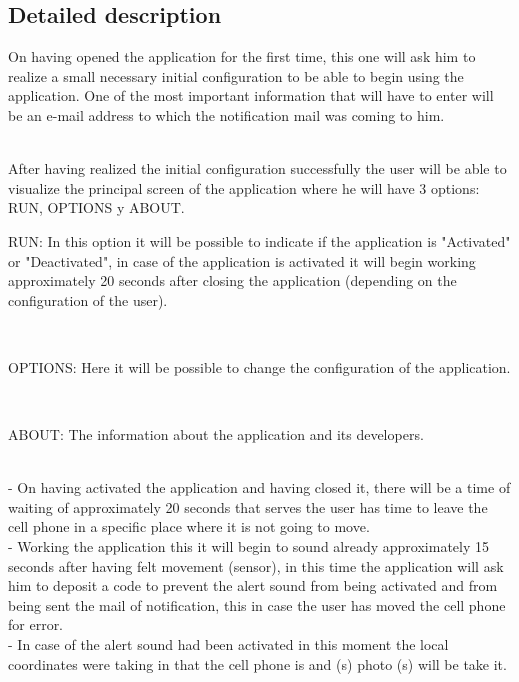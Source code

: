 \documentclass[12pt,letterpaper]{article}
\begin{document}
   
  \subsection{Detailed description}
  \begin{raggedleft}
  On having opened the application for the first time, this one will ask him to realize a small necessary initial configuration to be able to begin using the application.
  One of the most important information that will have to enter will be an e-mail address to which the notification mail was coming to him.
    \end{raggedleft}\\
  After having realized the initial configuration successfully the user will be able to visualize the principal screen of the application where he will have 3 options: RUN, OPTIONS y ABOUT.\\
  \begin{raggedleft}
  RUN: In this option it will be possible to indicate if the application is "Activated" or "Deactivated", in case of the application is activated it will begin working approximately 20 seconds after closing the application (depending on the configuration of the user).
    \end{raggedleft}\\
  \begin{raggedleft}
  OPTIONS: Here it will be possible to change the configuration of the application.
    \end{raggedleft}\\
  \begin{raggedleft}
  ABOUT: The information about the application and its developers.
  \end{raggedleft}\\
  
 - On having activated the application and having closed it, there will be a time of waiting of approximately 20 seconds that serves the user has time to leave the cell phone in a specific place where it is not going to move.\\
  
 - Working the application this it will begin to sound already approximately 15 seconds after having felt movement (sensor), in this time the application will ask him to deposit a code to prevent the alert sound from being activated and from being sent the mail of notification, this in case the user has moved the cell phone for error.\\
  
 - In case of the alert sound had been activated in this moment the local coordinates were taking in that the cell phone is and (s) photo (s) will be take it.\\
  
\end{document}
